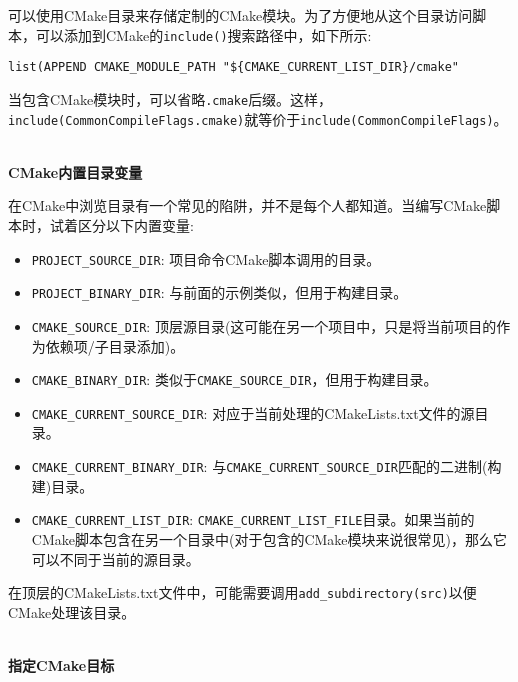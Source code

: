 可以使用CMake目录来存储定制的CMake模块。为了方便地从这个目录访问脚本，可以添加到CMake的\texttt{include()}搜索路径中，如下所示:

\begin{lstlisting}[style=styleCMake]
list(APPEND CMAKE_MODULE_PATH "${CMAKE_CURRENT_LIST_DIR}/cmake"
\end{lstlisting}

当包含CMake模块时，可以省略\texttt{.cmake}后缀。这样，\texttt{include(CommonCompileFlags.cmake)}就等价于\texttt{include(CommonCompileFlags)}。

\hspace*{\fill} \\ %
\noindent
\textbf{CMake内置目录变量}

在CMake中浏览目录有一个常见的陷阱，并不是每个人都知道。当编写CMake脚本时，试着区分以下内置变量:

\begin{itemize}
\item 
\texttt{PROJECT\_SOURCE\_DIR}: 项目命令CMake脚本调用的目录。

\item 
\texttt{PROJECT\_BINARY\_DIR}: 与前面的示例类似，但用于构建目录。

\item 
\texttt{CMAKE\_SOURCE\_DIR}: 顶层源目录(这可能在另一个项目中，只是将当前项目的作为依赖项/子目录添加)。

\item 
\texttt{CMAKE\_BINARY\_DIR}: 类似于\texttt{CMAKE\_SOURCE\_DIR}，但用于构建目录。

\item 
\texttt{CMAKE\_CURRENT\_SOURCE\_DIR}: 对应于当前处理的CMakeLists.txt文件的源目录。

\item 
\texttt{CMAKE\_CURRENT\_BINARY\_DIR}: 与\texttt{CMAKE\_CURRENT\_SOURCE\_DIR}匹配的二进制(构建)目录。

\item 
\texttt{CMAKE\_CURRENT\_LIST\_DIR}: \texttt{CMAKE\_CURRENT\_LIST\_FILE}目录。如果当前的CMake脚本包含在另一个目录中(对于包含的CMake模块来说很常见)，那么它可以不同于当前的源目录。
\end{itemize}

在顶层的CMakeLists.txt文件中，可能需要调用\texttt{add\_subdirectory(src)}以便CMake处理该目录。

\hspace*{\fill} \\ %
\noindent
\textbf{指定CMake目标}

